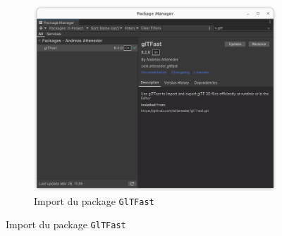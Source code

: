 \documentclass[a4paper,10pt]{article}
\begin{document}
\begin{figure}[h]
	\begin{subfigure}{\textwidth}
		\begin{center}
			\includegraphics[scale=.50]{fig/glTFast-package}
			\caption{Import du package \texttt{GlTFast}}
			\label{fig:glTFast-package}
		\end{center}
	\end{subfigure}
\end{figure}

\fi 
\end{document}
